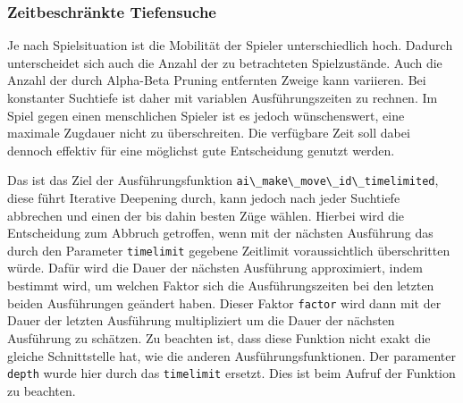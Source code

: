 \hypertarget{zeitbeschruxe4nkte-tiefensuche}{%
\subsubsection{Zeitbeschränkte
Tiefensuche}\label{zeitbeschruxe4nkte-tiefensuche}}

Je nach Spielsituation ist die Mobilität der Spieler unterschiedlich
hoch. Dadurch unterscheidet sich auch die Anzahl der zu betrachteten
Spielzustände. Auch die Anzahl der durch Alpha-Beta Pruning entfernten
Zweige kann variieren. Bei konstanter Suchtiefe ist daher mit variablen
Ausführungszeiten zu rechnen. Im Spiel gegen einen menschlichen Spieler
ist es jedoch wünschenswert, eine maximale Zugdauer nicht zu
überschreiten. Die verfügbare Zeit soll dabei dennoch effektiv für eine
möglichst gute Entscheidung genutzt werden.

Das ist das Ziel der Ausführungsfunktion
\passthrough{\lstinline!ai\_make\_move\_id\_timelimited!}, diese führt
Iterative Deepening durch, kann jedoch nach jeder Suchtiefe abbrechen
und einen der bis dahin besten Züge wählen. Hierbei wird die
Entscheidung zum Abbruch getroffen, wenn mit der nächsten Ausführung das
durch den Parameter \passthrough{\lstinline!timelimit!} gegebene
Zeitlimit voraussichtlich überschritten würde. Dafür wird die Dauer der
nächsten Ausführung approximiert, indem bestimmt wird, um welchen Faktor
sich die Ausführungszeiten bei den letzten beiden Ausführungen geändert
haben. Dieser Faktor \passthrough{\lstinline!factor!} wird dann mit der
Dauer der letzten Ausführung multipliziert um die Dauer der nächsten
Ausführung zu schätzen. Zu beachten ist, dass diese Funktion nicht exakt
die gleiche Schnittstelle hat, wie die anderen Ausführungsfunktionen.
Der paramenter \passthrough{\lstinline!depth!} wurde hier durch das
\passthrough{\lstinline!timelimit!} ersetzt. Dies ist beim Aufruf der
Funktion zu beachten.


